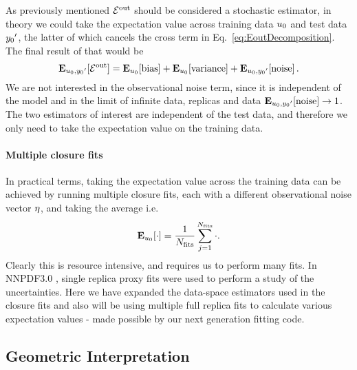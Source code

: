 As previously mentioned $\mathcal{E}^{\rm out}$ should be considered a stochastic estimator, in
theory we could take the expectation value across training data $u_0$ and
test data ${{y_0}^{\prime}}$, the latter of which cancels the cross term in
Eq.~\ref{eq:EoutDecomposition}. The final result of that would be
\begin{equation}\label{eq:ExpectedBiasVariance}
    \mathbf{E}_{u_0, {{y_0}^{\prime}}}[\mathcal{E}^{\rm out}] =
    \mathbf{E}_{u_0}[{\rm bias}] + 
    \mathbf{E}_{u_0}[{\rm variance}] +
    \mathbf{E}_{u_0, {{y_0}^{\prime}}}[{\rm noise}]\, .
\end{equation}
We are not interested in the observational noise term, since it is
independent of the model and in the limit of infinite data, replicas and data
$\mathbf{E}_{u_0, {{y_0}^{\prime}}}[{\rm noise}] \to 1$.
The two estimators of interest are independent of
the test data, and therefore we only need to take the expectation value on
the training data.

\paragraph{Multiple closure fits}
In practical terms, taking the expectation value across the training data can
be achieved by running multiple closure fits, each with a different
observational noise vector $\eta$, and taking the average i.e.
\begin{equation}
    \mathbf{E}_{u_0}[ \cdot ] = \frac{1}{N_{\rm fits}} \sum_{j=1}^{N_{\rm fits}} \cdot.
\end{equation}
Clearly this is resource intensive, and requires us to perform many fits. In
NNPDF3.0 \cite{nnpdf30}, single replica proxy fits were used to perform a study
of the uncertainties. Here we have expanded the data-space estimators used in
the closure fits and also will be using multiple full replica fits to
calculate various expectation values - made possible by our next generation
fitting code.

\subsection{Geometric Interpretation}

